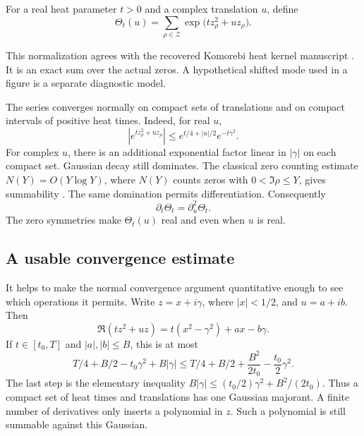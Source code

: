 \begin{definition}\label{rh:heatdef}
For a real heat parameter \(t>0\) and a complex translation \(u\), define
\begin{equation}\label{rh:theta}
\Theta_t(u)=\sum_{\rho\in\mathcal Z}
\exp\bigl(tz_\rho^2+uz_\rho\bigr).
\end{equation}
\end{definition}

This normalization agrees with the recovered Komorebi heat kernel manuscript \cite{KomorebiHeat}. It is an exact sum over the actual zeros. A hypothetical shifted mode used in a figure is a separate diagnostic model.

The series converges normally on compact sets of translations and on compact intervals of positive heat times. Indeed, for real \(u\),
\begin{equation}\label{rh:maj}
\left|e^{tz_\rho^2+uz_\rho}\right|
\le e^{t/4+|u|/2}e^{-t\gamma^2}.
\end{equation}
For complex \(u\), there is an additional exponential factor linear in \(|\gamma|\) on each compact set. Gaussian decay still dominates. The classical zero counting estimate \(N(Y)=O(Y\log Y)\), where \(N(Y)\) counts zeros with \(0<\Im\rho\le Y\), gives summability \cite[Section 2.4, equation (2.11)]{BondarenkoRadchenkoSeip}. The same domination permits differentiation. Consequently
\begin{equation}\label{rh:heatflow}
\partial_t\Theta_t=\partial_u^2\Theta_t.
\end{equation}
The zero symmetries make \(\Theta_t(u)\) real and even when \(u\) is real.

\subsection{A usable convergence estimate}

It helps to make the normal convergence argument quantitative enough to see which operations it permits. Write \(z=x+i\gamma\), where \(|x|<1/2\), and \(u=a+ib\). Then
\[
\Re(tz^2+uz)=t(x^2-\gamma^2)+ax-b\gamma.
\]
If \(t\in[t_0,T]\) and \(|a|,|b|\le B\), this is at most
\[
T/4+B/2-t_0\gamma^2+B|\gamma|
\le T/4+B/2+\frac{B^2}{2t_0}-\frac{t_0}2\gamma^2.
\]
The last step is the elementary inequality
\(B|\gamma|\le(t_0/2)\gamma^2+B^2/(2t_0)\).
Thus a compact set of heat times and translations has one Gaussian majorant. A finite number of derivatives only inserts a polynomial in \(z\). Such a polynomial is still summable against this Gaussian.


